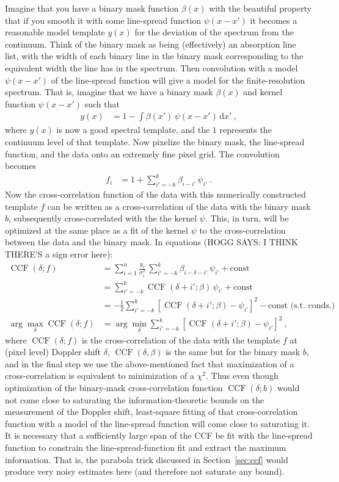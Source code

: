 \documentclass[modern]{aastex631}
\DeclareMathOperator{\CCF}{CCF}
\newcommand{\dd}{\mathrm{d}}
\newcommand{\sectionname}{Section}
\newcommand{\secref}[1]{\sectionname~\ref{#1}}
\begin{document}
Imagine that you have a binary mask function $\beta(x)$ with the beautiful property that if you smooth it with some line-spread function $\psi(x-x')$ it becomes a reasonable model template $y(x)$ for the deviation of the spectrum from the continuum.
Think of the binary mask as being (effectively) an absorption line list, with the width of each binary line in the binary mask corresponding to the equivalent width the line has in the spectrum.
Then convolution with a model $\psi(x-x')$ of the line-spread function will give a model for the finite-resolution spectrum.
That is, imagine that we have a binary mask $\beta(x)$ and kernel function $\psi(x-x')$ such that
\begin{align}
    y(x) &= 1 - \int\beta(x')\,\psi(x-x')\,\dd x' ~,
\end{align}
where $y(x)$ is now a good spectral template, and the $1$ represents the continuum level of that template.
Now pixelize the binary mask, the line-spread function, and the data onto an extremely fine pixel grid.
The convolution becomes
\begin{align}
    f_i &= 1 + \sum_{i'=-k}^k \beta_{i-i'}\,\psi_{i'} ~.
\end{align}
Now the cross-correlation function of the data with this numerically constructed template $f$ can be written as a cross-correlation of the data with the binary mask $b$, subsequently cross-correlated with the the kernel $\psi$.
This, in turn, will be optimized at the same place as a fit of the kernel $\psi$ to the cross-correlation between the data and the binary mask.
In equations (HOGG SAYS: I THINK THERE'S a sign error here):
\begin{align}
    \CCF(\delta; f) &= \sum_{i=1}^n \frac{y_i}{\sigma_i^2}\,\sum_{i'=-k}^k \beta_{i-\delta-i'}\,\psi_{i'} + \text{const}\\
    &= \sum_{i'=-k}^k \CCF(\delta+i';\beta)\,\psi_{i'} + \text{const}\\
    &= -\frac{1}{2}\sum_{i'=-k}^k [\CCF(\delta+i';\beta) - \psi_{i'}]^2 - \text{const}\mbox{~(s.t. conds.)}\\
    \arg\max_{\delta} \CCF(\delta; f) &= \arg\min_{\delta} \sum_{i'=-k}^k [\CCF(\delta+i';\beta) - \psi_{i'}]^2 ~,
\end{align}
where $\CCF(\delta; f)$ is the cross-correlation of the data with the template $f$ at (pixel level) Doppler shift $\delta$,
$\CCF(\delta, \beta)$ is the same but for the binary mask $b$,
and in the final step we use the above-mentioned fact that maximization of a cross-correlation is equivalent to minimization of a $\chi^2$.
Thus even though optimization of the binary-mask cross-correlation function $\CCF(\delta; b)$ would not come close to saturating the information-theoretic bounds on the measurement of the Doppler shift, least-square fitting of that cross-correlation function with a model of the line-spread function will come close to saturating it. 
It is necessary that a sufficiently large span of the CCF be fit with the line-spread function to constrain the line-spread-function fit and extract the maximum information.
That is, the parabola trick discussed in \secref{sec:ccf} would produce very noisy estimates here (and therefore not saturate any bound).
\end{document}
